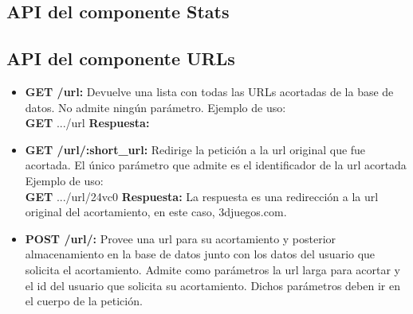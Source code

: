 \documentclass[a4paper]{article}
\begin{document}
	\subsection{API del componente Stats}
	
	\subsection{API del componente URLs}
	\begin{itemize}
		\item \textbf{GET /url:} Devuelve una lista con todas las URLs acortadas de la base de datos. No admite ningún parámetro.
		Ejemplo de uso:
		\newline
		\\ \textbf{GET} .../url
		\newline \textbf{Respuesta:}
		\item \textbf{GET /url/:short\_url:} Redirige la petición a la url original que fue acortada. El único parámetro que admite es el identificador de la url acortada
		Ejemplo de uso:
		\newline
		\\ \textbf{GET} .../url/24vc0
		\newline \textbf{Respuesta:}
		\newline La respuesta es una redirección a la url original del acortamiento, en este caso, 3djuegos.com.
		\newpage
		\item \textbf{POST /url/:} Provee una url para su acortamiento y posterior almacenamiento en la base de datos junto con los datos del usuario que solicita el acortamiento. Admite como parámetros la url larga para acortar y el id del usuario que solicita su acortamiento. Dichos parámetros deben ir en el cuerpo de la petición.

\end{itemize}
\end{document}

